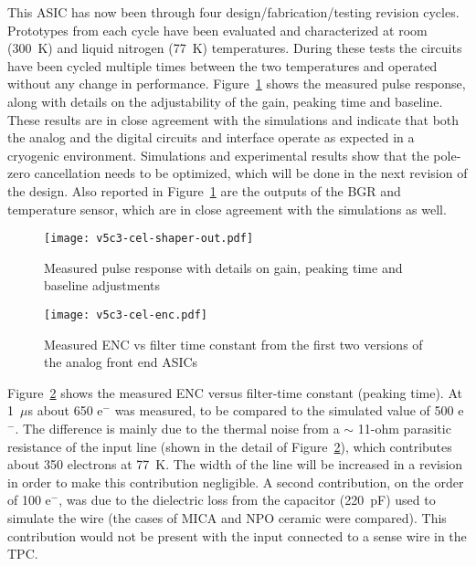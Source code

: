 This ASIC has now been through four design/fabrication/testing revision cycles.
Prototypes from each cycle have been evaluated and characterized at room (300~K) and liquid nitrogen (77~K) temperatures.
During these tests the circuits have been cycled multiple times
between the two temperatures and operated without any change in performance.
Figure~\ref{fig:ce-elec-shaper-out} shows the measured pulse response, along with
details on the adjustability of the gain, peaking time and baseline.
These results are in close agreement with the simulations and indicate
that both the analog and the digital circuits and interface operate as
expected in a cryogenic environment.
Simulations and experimental results show that the pole-zero cancellation needs to be optimized,
which will be done in the next revision of the design.
Also reported in Figure~\ref{fig:ce-elec-shaper-out} are the outputs of the BGR and temperature sensor,
which are in close agreement with the simulations as well.

\begin{figure}[htbp]
\centering
\texttt{[image: v5c3-cel-shaper-out.pdf]}
\caption[Measured pulse response with details]{Measured pulse response with details on gain, peaking time and baseline adjustments}
\label{fig:ce-elec-shaper-out}
\end{figure}


\begin{figure}[htbp]
\centering
\texttt{[image: v5c3-cel-enc.pdf]}
\caption[Measured ENC vs filter time constant]{Measured ENC vs filter time constant from the first two versions of the analog front end ASICs}
\label{fig:ce-elec-enc}
\end{figure}


Figure~\ref{fig:ce-elec-enc} shows the measured ENC versus filter-time constant (peaking time).
At 1~$\mu$s about 650 e$^{-}$ was measured,
to be compared to the simulated value of 500 e$^{-}$. The difference is
mainly due to the thermal noise from a $\sim$
11-ohm parasitic resistance of the input
line (shown in the detail of Figure~\ref{fig:ce-elec-enc}), which contributes about 350
electrons at 77~K. The width of the line will be increased in a
revision in order to make this contribution negligible. A second
contribution, on the order of 100 e$^{-}$, was due to the dielectric
loss from the  capacitor (220~pF) used to simulate the wire (the cases of MICA and NPO ceramic were compared). This contribution would not be
present with the input connected to a sense wire in the TPC.

